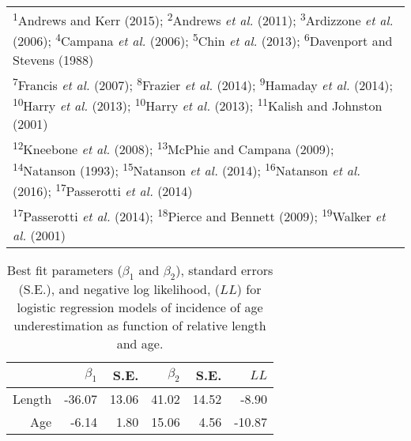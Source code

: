 \documentclass[]{article}
\begin{document}
\begin{landscape}
\begin{table}[ht]
\begin{tabular}{lllp{1.2cm}p{1.2cm}p{0.9cm}p{0.9cm}p{0.9cm}lp{8.5cm}}
   \bottomrule
\multicolumn{10}{l}{\rule{0em}{2.5ex}\textsuperscript{1}{Andrews and Kerr (2015)}; \textsuperscript{2}{Andrews \textit{et al.} (2011)}; \textsuperscript{3}{Ardizzone \textit{et al.} (2006)}; \textsuperscript{4}{Campana \textit{et al.} (2006)}; \textsuperscript{5}{Chin \textit{et al.} (2013)}; \textsuperscript{6}{Davenport and Stevens (1988)}}\\

\multicolumn{10}{l}{\textsuperscript{7}{Francis \textit{et al.} (2007)}; \textsuperscript{8}{Frazier \textit{et al.} (2014)}; \textsuperscript{9}{Hamaday \textit{et al.} (2014)}; \textsuperscript{10}{Harry \textit{et al.} (2013)}; \textsuperscript{10}{Harry \textit{et al.} (2013)}; \textsuperscript{11}{Kalish and Johnston (2001)}}\\

\multicolumn{10}{l}{\textsuperscript{12}{Kneebone \textit{et al.} (2008)}; \textsuperscript{13}{McPhie and Campana (2009)}; \textsuperscript{14}{Natanson (1993)}; \textsuperscript{15}{Natanson \textit{et al.} (2014)}; \textsuperscript{16}{Natanson \textit{et al.} (2016)}; \textsuperscript{17}{Passerotti \textit{et al.} (2014)}}\\

\multicolumn{10}{l}{\textsuperscript{17}{Passerotti \textit{et al.} (2014)}; \textsuperscript{18}{Pierce and Bennett (2009)}; \textsuperscript{19}{Walker \textit{et al.} (2001)}}\\
\end{tabular}
\end{table}
\end{landscape}

\newpage

\begin{table}[ht]
\centering
\caption{Best fit parameters ($\beta_1$ and $\beta_2$), standard errors (S.E.), and negative log likelihood, ($LL$) for logistic regression models of incidence of age underestimation as function of relative length and age.\newline} 
\begin{tabular}{rrrrrr}
  \toprule
 & $\beta_1$ & S.E. & $\beta_2$ & S.E. & $LL$ \\ 
  \midrule
Length & -36.07 & 13.06 & 41.02 & 14.52 & -8.90 \\ 
  Age & -6.14 & 1.80 & 15.06 & 4.56 & -10.87 \\ 
   \bottomrule
\end{tabular}
\end{table}
\end{document}
